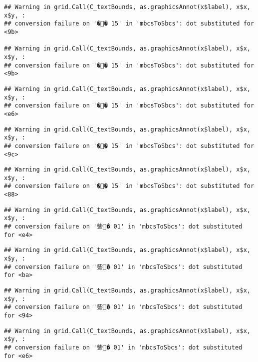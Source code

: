 \documentclass[]{article}
\begin{document}
\begin{verbatim}
## Warning in grid.Call(C_textBounds, as.graphicsAnnot(x$label), x$x, x$y, :
## conversion failure on '�� 15' in 'mbcsToSbcs': dot substituted for <9b>

## Warning in grid.Call(C_textBounds, as.graphicsAnnot(x$label), x$x, x$y, :
## conversion failure on '�� 15' in 'mbcsToSbcs': dot substituted for <9b>
\end{verbatim}

\begin{verbatim}
## Warning in grid.Call(C_textBounds, as.graphicsAnnot(x$label), x$x, x$y, :
## conversion failure on '�� 15' in 'mbcsToSbcs': dot substituted for <e6>
\end{verbatim}

\begin{verbatim}
## Warning in grid.Call(C_textBounds, as.graphicsAnnot(x$label), x$x, x$y, :
## conversion failure on '�� 15' in 'mbcsToSbcs': dot substituted for <9c>
\end{verbatim}

\begin{verbatim}
## Warning in grid.Call(C_textBounds, as.graphicsAnnot(x$label), x$x, x$y, :
## conversion failure on '�� 15' in 'mbcsToSbcs': dot substituted for <88>
\end{verbatim}

\begin{verbatim}
## Warning in grid.Call(C_textBounds, as.graphicsAnnot(x$label), x$x, x$y, :
## conversion failure on '鈭� 01' in 'mbcsToSbcs': dot substituted for <e4>
\end{verbatim}

\begin{verbatim}
## Warning in grid.Call(C_textBounds, as.graphicsAnnot(x$label), x$x, x$y, :
## conversion failure on '鈭� 01' in 'mbcsToSbcs': dot substituted for <ba>
\end{verbatim}

\begin{verbatim}
## Warning in grid.Call(C_textBounds, as.graphicsAnnot(x$label), x$x, x$y, :
## conversion failure on '鈭� 01' in 'mbcsToSbcs': dot substituted for <94>
\end{verbatim}

\begin{verbatim}
## Warning in grid.Call(C_textBounds, as.graphicsAnnot(x$label), x$x, x$y, :
## conversion failure on '鈭� 01' in 'mbcsToSbcs': dot substituted for <e6>
\end{verbatim}
\end{document}
